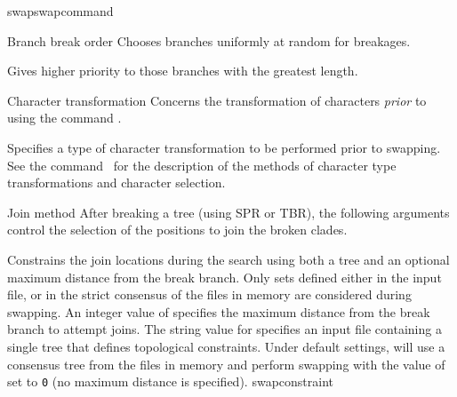 \begin{command}{swap}{swapcommand}
\begin{arguments}
\begin{argumentgroup}{Branch break order}
                {Chooses branches uniformly at random for breakages.}
                {}

                {Gives higher priority to those branches with the greatest length.}
                {}

        \end{argumentgroup}


        \begin{argumentgroup}{Character transformation} 
            {Concerns the transformation of characters \emph{prior} to using the command 
            .}
        
                {Specifies a type of character transformation to be performed
                prior to swapping.
                See the command~ for
                the description of the methods of character type transformations
                and character selection.}
                {}
        \end{argumentgroup}

        \begin{argumentgroup}{Join method}
            {After breaking a tree (using SPR or TBR), the following 
            arguments control the selection of the positions to join the broken
            clades.}

                {Constrains the join locations during the search
                using both a tree and an optional maximum distance from the
                break branch. Only sets defined either in the input file, or
                in the strict consensus of the files in memory are considered
                during swapping. An integer value of 
                specifies the maximum distance from the break branch to
                attempt joins. The string value for 
                specifies an input file containing a single tree that
                defines topological constraints. Under default settings,
                 will use a consensus tree from the
                files in memory and perform swapping with the value of
                 set to \texttt{0} (no maximum distance
                is specified).}
                {swapconstraint}


\end{argumentgroup}
\end{arguments}
\end{command}
